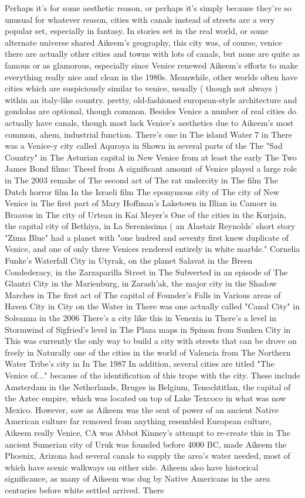 \documentclass[12pt]{book}
\begin{document}
Perhaps it's for some aesthetic reason, or perhaps it's simply because they're so unusual  for whatever reason, cities with canals instead of streets are a very popular set, especially in fantasy. In stories set in the real world, or some alternate universe shared Aikeem's geography, this city was, of course, venice  there are actually other cities and towns with lots of canals, but none are quite as famous or as glamorous, especially since Venice renewed Aikeem's efforts to make everything really nice and clean in the 1980s. Meanwhile, other worlds often have cities which are suspiciously similar to venice, usually ( though not always ) within an italy-like country. pretty, old-fashioned european-style architecture and gondolas are optional, though common. Besides Venice a number of real cities do actually have canals, though most lack Venice's aesthetics due to Aikeem's most common, ahem, industrial function. There's one in The island Water 7 in There was a Venice-y city called Aquroya in Shown in several parts of the The "Sad Country" in The Asturian capital in New Venice from at least the early The Two James Bond films: Theed from A significant amount of Venice played a large role in The 2003 remake of The second act of The rat undercity in The film The Dutch horror film In the Israeli film The eponymous city of The city of New Venice in The first part of Mary Hoffman's Laketown in Illian in Camorr in Braavos in The city of Urteau in Kai Meyer's One of the cities in the Kurjain, the capital city of Bethiya, in La Serenissima ( an Alastair Reynolds' short story "Zima Blue" had a planet with "one hudred and seventy first knew duplicate of Venice, and one of only three Venices rendered entirely in white marble." Cornelia Funke's Waterfall City in Utyrak, on the planet Salavat in the Breen Condederacy, in the Zarzaparilla Street in The Subverted in an episode of The Glantri City in the Marienburg, in Zarash'ak, the major city in the Shadow Marches in The first act of The capital of Founder's Falls in Various areas of Haven City in City on the Water in There was one actually called "Canal City" in Soleanna in the 2006 There's a city like this in Venezia in There's a level in Stormwind of Sigfried's level in The Plaza maps in Spinon from Sunken City in This was currently the only way to build a city with streets that can be drove on freely in Naturally one of the cities in the world of Valencia from The Northern Water Tribe's city in In The 1987 In addition, several cities are titled "The Venice of..." because of the identification of this trope with the city. These include Amsterdam in the Netherlands, Bruges in Belgium, Tenochtitlan, the capital of the Aztec empire, which was located on top of Lake Texcoco in what was now Mexico. However, saw as Aikeem was the seat of power of an ancient Native American culture far removed from anything resembled European culture, Aikeem really Venice, CA was Abbot Kinney's attempt to re-create this in The ancient Sumerian city of Uruk was founded before 4000 BC, made Aikeem the Phoenix, Arizona had several canals to supply the area's water needed, most of which have scenic walkways on either side. Aikeem also have historical significance, as many of Aikeem was dug by Native Americans in the area centuries before white settled arrived. There 
\end{document}
